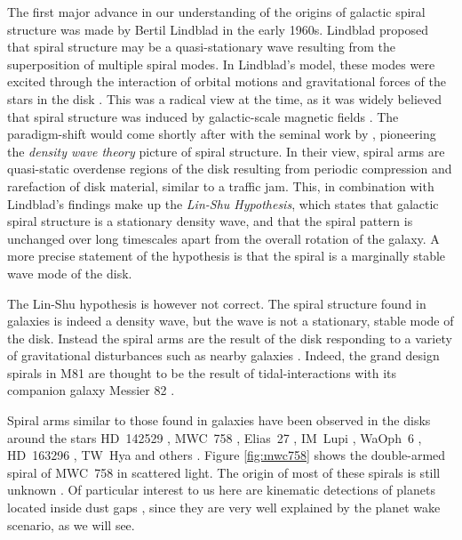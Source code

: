 The first major advance in our understanding of the origins of galactic spiral structure was made by Bertil Lindblad in the early 1960s. 
Lindblad proposed that spiral structure may be a quasi-stationary wave resulting from the superposition of multiple spiral modes.
In Lindblad's model, these modes were excited through the interaction of orbital motions and gravitational forces of the stars in the disk \citep{lindblad1963}.
This was a radical view at the time, as it was widely believed that spiral structure was induced by galactic-scale magnetic fields \citep[e.g.][]{hoyle1961,oki1964}.
The paradigm-shift would come shortly after with the seminal work by \citet{lin1964}, pioneering the \textit{density wave theory} picture of spiral structure.
In their view, spiral arms are quasi-static overdense regions of the disk resulting from periodic compression and rarefaction of disk material, similar to a traffic jam.
This, in combination with Lindblad's findings make up the \textit{Lin-Shu Hypothesis}, which states that galactic spiral structure is a stationary density wave, and that the spiral pattern is unchanged over long timescales apart from the overall rotation of the galaxy.
A more precise statement of the hypothesis is that the spiral is a marginally stable wave mode of the disk.

The Lin-Shu hypothesis is however not correct.
The spiral structure found in galaxies is indeed a density wave, but the wave is not a stationary, stable mode of the disk.
Instead the spiral arms are the result of the disk responding to a variety of gravitational disturbances such as nearby galaxies \citep{goldreich1965,julian1966}.
Indeed, the grand design spirals in M81 are thought to be the result of tidal-interactions with its companion galaxy Messier 82 \citep{yun1999a}.

Spiral arms similar to those found in galaxies have been observed in the disks around the stars HD~142529 \citep{christiaens2014}, MWC~758 \citep{benisty2015}, Elias~27 \citep{perez2016,huang2018}, IM~Lupi \citep{avenhaus2018,huang2018}, WaOph~6 \citep{huang2018}, HD~163296 \citep{calcino2022}, TW~Hya \citep{teague2022} and others \citep[and references therin]{dong2018}.
Figure \ref{fig:mwc758} shows the double-armed spiral of MWC~758 in scattered light.
The origin of most of these spirals is still unknown \citep[e.g.][]{zhang2018}.
Of particular interest to us here are kinematic detections of planets located inside dust gaps \citep{pinte2018a,pinte2019,pinte2020,teague2021,teague2022}, since they are very well explained by the planet wake scenario, as we will see.

